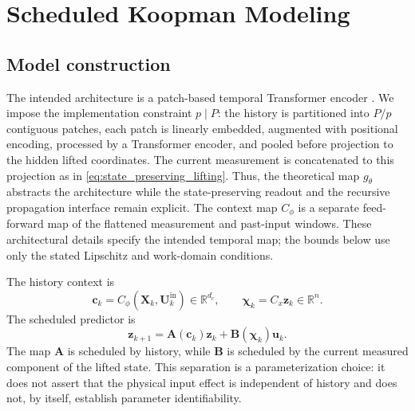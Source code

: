 ﻿\documentclass[journal]{IEEEtran}
\newcommand{\vu}{\mathbf{u}}
\newcommand{\vz}{\mathbf{z}}
\newcommand{\vc}{\mathbf{c}}
\newcommand{\vchi}{\boldsymbol{\chi}}
\newcommand{\mA}{\mathbf{A}}
\newcommand{\mB}{\mathbf{B}}
\newcommand{\mU}{\mathbf{U}}
\newcommand{\mX}{\mathbf{X}}
\newcommand{\R}{\mathbb{R}}
\begin{document}
\section{Scheduled Koopman Modeling}
\label{sec:model}

\subsection{Model construction}

The intended architecture is a patch-based temporal Transformer encoder \cite{vaswani2017attention,nie2023time}. We impose the implementation constraint $p\mid P$: the history is partitioned into $P/p$ contiguous patches, each patch is linearly embedded, augmented with positional encoding, processed by a Transformer encoder, and pooled before projection to the hidden lifted coordinates. The current measurement is concatenated to this projection as in \eqref{eq:state_preserving_lifting}. Thus, the theoretical map $g_\theta$ abstracts the architecture while the state-preserving readout and the recursive propagation interface remain explicit. The context map $C_\phi$ is a separate feed-forward map of the flattened measurement and past-input windows. These architectural details specify the intended temporal map; the bounds below use only the stated Lipschitz and work-domain conditions.

The history context is
\begin{equation}
    \vc_k=C_\phi(\mX_k,\mU_k^{\mathrm{in}})\in\R^{d_c},
    \qquad \vchi_k=C_x\vz_k\in\R^n.
    \label{eq:scheduling_variables}
\end{equation}
The scheduled predictor is
\begin{equation}
    \boxed{\vz_{k+1}=\mA(\vc_k)\vz_k+\mB(\vchi_k)\vu_k.}
    \label{eq:scheduled_predictor}
\end{equation}
The map $\mA$ is scheduled by history, while $\mB$ is scheduled by the current measured component of the lifted state. This separation is a parameterization choice: it does not assert that the physical input effect is independent of history and does not, by itself, establish parameter identifiability.
\end{document}
